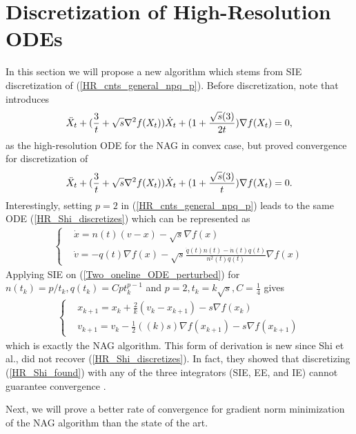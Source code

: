 \documentclass{article}
\theoremstyle{plain}
\theoremstyle{definition}
\theoremstyle{remark}
\begin{document}
\section{Discretization of High-Resolution ODEs}
In this section we will propose a new algorithm which stems from SIE discretization of (\ref{HR_cnts_general_npq_p}). Before discretization, note that \cite{shi2019acceleration} introduces 
\begin{align}\label{HR_Shi_found}
     \Ddot{X}_t + (\frac{3}{t}+\sqrt{s}\nabla^2 f(X_t))\dot{X}_t+(1+\frac{\sqrt{s}(3)}{2t})\nabla f(X_t)=0,
\end{align}
as the high-resolution ODE for the NAG in convex case, but proved convergence for discretization of \begin{align}\label{HR_Shi_discretizes}
     \Ddot{X}_t + (\frac{3}{t}+\sqrt{s}\nabla^2 f(X_t))\dot{X}_t+(1+\frac{\sqrt{s}(3)}{t})\nabla f(X_t)=0.
\end{align}
Interestingly, setting $p=2$ in (\ref{HR_cnts_general_npq_p}) leads to the same ODE (\ref{HR_Shi_discretizes}) which can be represented as
\begin{align}\label{Two_oneline_ODE_perturbed}
   \left\{ \begin{array}{ll}
    & \dot{x}   =     n(t)(v-x)-\sqrt{s}\nabla f(x)\\
     &\dot{v}    =  -q(t)\nabla f(x) - \sqrt{s}\frac{\dot q(t)n(t)-\dot n(t)q(t)}{n^2(t)q(t)} \nabla f(x)
    \end{array}\right.
\end{align}
Applying SIE on (\ref{Two_oneline_ODE_perturbed}) for $n(t_k)=p/t_k,q(t_k)=Cpt_k^{p-1}$ and $p=2,t_k=k\sqrt{s},C=\tfrac{1}{4}$ gives 
\begin{align}\label{new_algorithm}
   \left\{ \begin{array}{ll}
    &x_{k+1}   =    x_{k} + \frac{2}{k}(v_k-x_{k+1})-{s}\nabla f(x_k)\\
     &v_{k+1}    = v_k -\tfrac{1}{2}((k)s)\nabla f(x_{k+1})-s\nabla f(x_{k+1}) 
    \end{array}\right.
\end{align}
 which is exactly the NAG algorithm. This form of derivation is new since Shi et al., did not recover (\ref{HR_Shi_discretizes}). In fact, they showed that discretizing (\ref{HR_Shi_found}) with any of the three integrators (SIE, EE, and IE) cannot guarantee convergence \cite{shi2019acceleration}. \par
Next, we will prove a better rate of convergence for gradient norm minimization of the NAG algorithm than the state of the art. 
\end{document}
